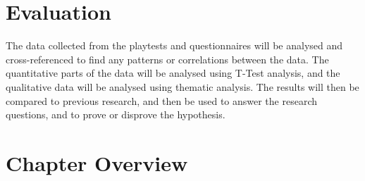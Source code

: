 \begin{spacing}{2.0}
	\section{Evaluation}

	The data collected from the playtests and questionnaires will be analysed and cross-referenced to find any patterns or correlations between the data.
	The quantitative parts of the data will be analysed using T-Test analysis, and the qualitative data will be analysed using thematic analysis. The results will then be compared to previous research,
	and then be used to answer the research questions, and to prove or disprove the hypothesis.

	\section{Chapter Overview}

\end{spacing}
\newpage

